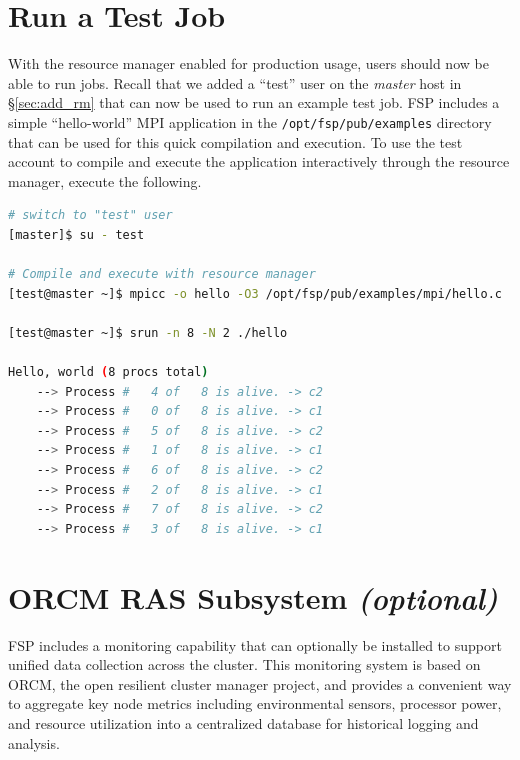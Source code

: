 \documentclass[letterpaper]{article}
\begin{document}
\section{Run a Test Job}

With the resource manager enabled for production usage, users should now be
able to run jobs. 
Recall that we added a ``test'' user on the {\em master} host in
\S\ref{sec:add_rm} that can now be used to run an example test job.  FSP
includes a simple ``hello-world'' MPI application in the
\texttt{/opt/fsp/pub/examples} directory that can be used for this quick
compilation and execution.  To use the test account to compile and execute the 
application interactively through the resource manager, execute the following.

\begin{lstlisting}[language=bash,keywords={}]
# switch to "test" user
[master]$ su - test

# Compile and execute with resource manager
[test@master ~]$ mpicc -o hello -O3 /opt/fsp/pub/examples/mpi/hello.c

[test@master ~]$ srun -n 8 -N 2 ./hello

Hello, world (8 procs total)
    --> Process #   4 of   8 is alive. -> c2
    --> Process #   0 of   8 is alive. -> c1
    --> Process #   5 of   8 is alive. -> c2
    --> Process #   1 of   8 is alive. -> c1
    --> Process #   6 of   8 is alive. -> c2
    --> Process #   2 of   8 is alive. -> c1
    --> Process #   7 of   8 is alive. -> c2
    --> Process #   3 of   8 is alive. -> c1
\end{lstlisting}

\section{ORCM RAS Subsystem {\em(optional)}}

FSP includes a monitoring capability that can optionally be installed to
support unified data collection across the cluster. This monitoring system is
based on ORCM, the open resilient cluster manager project, and provides a
convenient way to aggregate key node metrics including environmental sensors,
processor power, and resource utilization into a centralized database for
historical logging and analysis.
\end{document}
